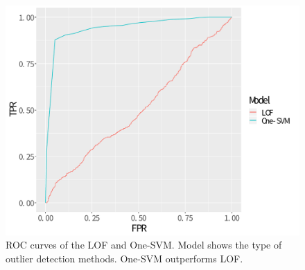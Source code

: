 \documentclass[dvipdfmx, english]{ampmt}             %
\begin{document}
\begin{figure}[H]
\centerline{\includegraphics[scale=0.5]{../img/credit-roc.pdf}}
\caption{ROC curves of the LOF and One-SVM. Model shows the type of outlier detection methods. One-SVM outperforms LOF.}
\label{fig:credit-roc}
\end{figure}



\end{document}
